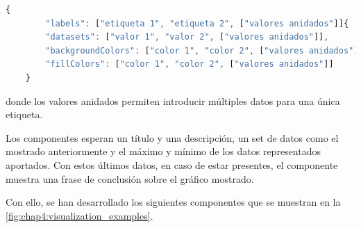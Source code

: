 \begin{lstlisting}[language=JavaScript]
	{
		"labels": ["etiqueta 1", "etiqueta 2", ["valores anidados"]]{
		"datasets": ["valor 1", "valor 2", ["valores anidados"]],
		"backgroundColors": ["color 1", "color 2", ["valores anidados"]],
		"fillColors": ["color 1", "color 2", ["valores anidados"]]
	}
\end{lstlisting}

donde los valores anidados permiten introducir múltiples datos para una única etiqueta.

Los componentes esperan un título y una descripción, un set de datos como el mostrado anteriormente y el máximo y mínimo de los datos representados aportados. Con estos últimos datos, en caso de estar presentes, el componente muestra una frase de conclusión sobre el gráfico mostrado.

Con ello, se han desarrollado los siguientes componentes que se muestran en la \autoref{fig:chap4:visualization_examples}.


